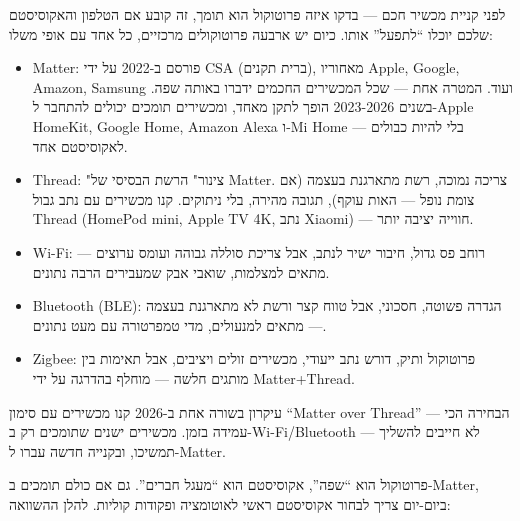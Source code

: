 


לפני קניית מכשיר חכם — בדקו איזה פרוטוקול הוא תומך, זה קובע אם הטלפון והאקוסיסטם שלכם יוכלו “לתפעל” אותו. כיום יש ארבעה פרוטוקולים מרכזיים, כל אחד עם אופי משלו:

\begin{itemize}
  \item Matter: פורסם ב-2022 על ידי CSA (ברית תקנים), מאחוריו Apple, Google, Amazon, Samsung ועוד. המטרה אחת — שכל המכשירים החכמים ידברו באותה שפה. בשנים 2023-2026 הופך לתקן מאחד, ומכשירים תומכים יכולים להתחבר ל-Apple HomeKit, Google Home, Amazon Alexa ו-Mi Home — בלי להיות כבולים לאקוסיסטם אחד.
  \item Thread: "צינור" הרשת הבסיסי של Matter. צריכה נמוכה, רשת מתארגנת בעצמה (אם צומת נופל — האות עוקף), תגובה מהירה, בלי ניתוקים. קנו מכשירים עם נתב גבול Thread (HomePod mini, Apple TV 4K, נתב Xiaomi) — חווייה יציבה יותר.
  \item Wi-Fi: רוחב פס גדול, חיבור ישיר לנתב, אבל צריכת סוללה גבוהה ועומס ערוצים — מתאים למצלמות, שואבי אבק שמעבירים הרבה נתונים.
  \item Bluetooth (BLE): הגדרה פשוטה, חסכוני, אבל טווח קצר ורשת לא מתארגנת בעצמה — מתאים למנעולים, מדי טמפרטורה עם מעט נתונים.
  \item Zigbee: פרוטוקול ותיק, דורש נתב ייעודי, מכשירים זולים ויציבים, אבל תאימות בין מותגים חלשה — מוחלף בהדרגה על ידי Matter+Thread.
\end{itemize}

\begin{tcbinfo}{עיקרון בשורה אחת}
ב-2026 קנו מכשירים עם סימון “Matter over Thread” — הבחירה הכי עמידה בזמן. מכשירים ישנים שתומכים רק ב-Wi-Fi/Bluetooth לא חייבים להשליך — תמשיכו, ובקנייה חדשה עברו ל-Matter.

\end{tcbinfo}


פרוטוקול הוא “שפה”, אקוסיסטם הוא “מעגל חברים”. גם אם כולם תומכים ב-Matter, ביום-יום צריך לבחור אקוסיסטם ראשי לאוטומציה ופקודות קוליות. להלן ההשוואה:

